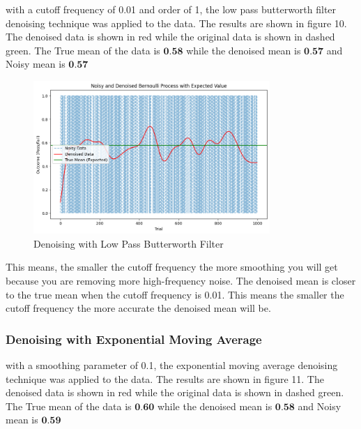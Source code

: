 \documentclass[a4paper,12pt]{article} %
\begin{document}
\clearpage
with a cutoff frequency of 0.01 and order of 1, the low pass butterworth filter denoising technique was applied to the data. The results are shown in figure 10. The denoised data is shown in red while the original data is shown in dashed green. The True mean of the data is \(\textbf{0.58}\) while the denoised mean is \(\textbf{0.57}\) and Noisy mean is \(\textbf{0.57}\)
\begin{figure}[h]
\centering
\includegraphics[width=0.8\textwidth]{o.1.png}
\caption{Denoising with Low Pass Butterworth Filter}
\end{figure}
This means, the smaller the cutoff frequency the more smoothing you will get because you are removing more high-frequency noise. The denoised mean is closer to the true mean when the cutoff frequency is 0.01. This means the smaller the cutoff frequency the more accurate the denoised mean will be.
\subsubsection{ Denoising with Exponential Moving Average}
with a smoothing parameter of 0.1, the exponential moving average denoising technique was applied to the data. The results are shown in figure 11. The denoised data is shown in red while the original data is shown in dashed green. The True mean of the data is \(\textbf{0.60}\) while the denoised mean is \(\textbf{0.58}\) and Noisy mean is \(\textbf{0.59}\)
\end{document}
